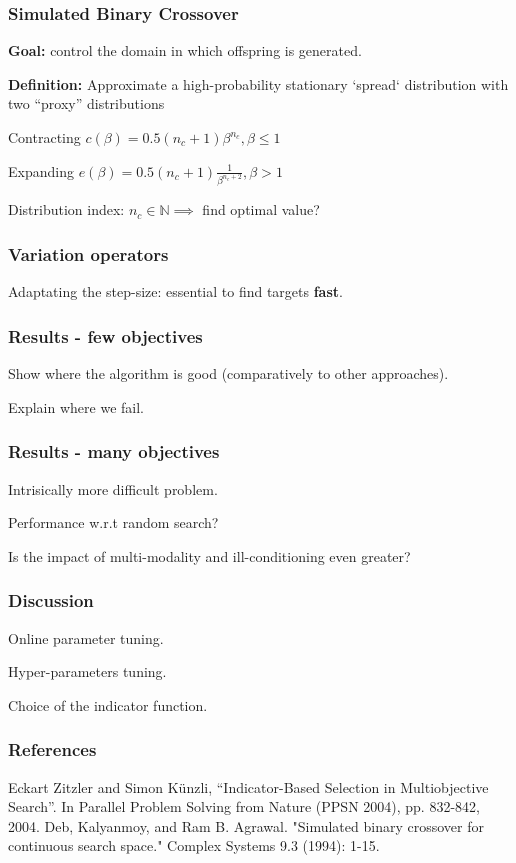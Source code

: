 \documentclass[12pt]{beamer}
\begin{document}
  \begin{frame}
    \frametitle{Simulated Binary Crossover}
    \textbf{Goal:} control the domain in which offspring is generated.
    
    \textbf{Definition:} Approximate a high-probability stationary `spread` distribution with two ``proxy'' distributions
    
    Contracting $ c(\beta) = 0.5(n_c +1)\beta^{n_c}, \beta \leq 1$
    
	Expanding $ e(\beta) = 0.5(n_c +1)\frac{1}{\beta^{n_c+2}}, \beta > 1$
        
    Distribution index: $n_c \in \mathbb{N} \implies$ find optimal value?
  \end{frame}
    
    \begin{frame}
    \frametitle{Variation operators}
    \subtitle{Low mutation probability}
    Adaptating the step-size: essential to find targets \textbf{fast}.
    
  \end{frame}
  
      \begin{frame}
    \frametitle{Results - few objectives}
    Show where the algorithm is good (comparatively to other approaches).
    
    Explain where we fail.
  \end{frame}
  
        \begin{frame}
    \frametitle{Results - many objectives}
    Intrisically more difficult problem.
    
    Performance w.r.t random search?
    
    Is the impact of multi-modality and ill-conditioning even greater?
  \end{frame}
  
      \begin{frame}
    \frametitle{Discussion}
    Online parameter tuning.
    
    Hyper-parameters tuning.
    
    Choice of the indicator function.
  \end{frame}
  
  \begin{frame}
  \end{frame}
  
    
  
\begin{frame}[allowframebreaks]
  \frametitle<presentation>{References}    
\begin{thebibliography}{}
\beamertemplatearticlebibitems
{} Eckart Zitzler and Simon Künzli, “Indicator-Based Selection in Multiobjective Search”. In Parallel Problem Solving from Nature (PPSN 2004), pp. 832-842, 2004.
 Deb, Kalyanmoy, and Ram B. Agrawal. "Simulated binary crossover for continuous search space." Complex Systems 9.3 (1994): 1-15.
\end{thebibliography}
\end{frame}
\end{document}
